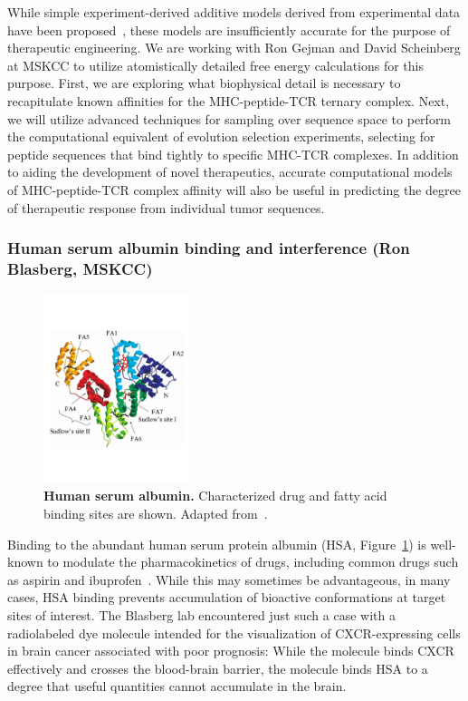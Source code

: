 \documentclass[10pt]{article}
\begin{document}
While simple experiment-derived additive models derived from experimental data have been proposed~\cite{Birnbaum:2014:Cell}, these models are insufficiently accurate for the purpose of therapeutic engineering.
We are working with Ron Gejman and David Scheinberg at MSKCC to utilize atomistically detailed free energy calculations for this purpose.
First, we are exploring what biophysical detail is necessary to recapitulate known affinities for the MHC-peptide-TCR ternary complex.
Next, we will utilize advanced techniques for sampling over sequence space to perform the computational equivalent of evolution selection experiments, selecting for peptide sequences that bind tightly to specific MHC-TCR complexes.
In addition to aiding the development of novel therapeutics, accurate computational models of MHC-peptide-TCR complex affinity will also be useful in predicting the degree of therapeutic response from individual tumor sequences.

\vspace{-0.5cm}
\subsubsection*{Human serum albumin binding and interference (Ron Blasberg, MSKCC)}
\vspace{-0.3cm}

\begin{figure}
\vspace{-2.3cm}
\includegraphics[width=0.38\textwidth]{figures/hsa-binding-sites.pdf}
\vspace{-2.5cm}
\caption{\footnotesize \label{figure:hsa} {\bf Human serum albumin.}
Characterized drug and fatty acid binding sites are shown.
Adapted from~\cite{fasano:iubmb-life:2005:hsa-review}.}
\end{figure}

Binding to the abundant human serum protein albumin (HSA, Figure~\ref{figure:hsa}) is well-known to modulate the pharmacokinetics of drugs, including common drugs such as aspirin and ibuprofen~\cite{fasano:iubmb-life:2005:hsa-review}.
While this may sometimes be advantageous, in many cases, HSA binding prevents accumulation of bioactive conformations at target sites of interest.
The Blasberg lab encountered just such a case with a radiolabeled dye molecule intended for the visualization of CXCR-expressing cells in brain cancer associated with poor prognosis: While the molecule binds CXCR effectively and crosses the blood-brain barrier, the molecule binds HSA to a degree that useful quantities cannot accumulate in the brain.
\end{document}
